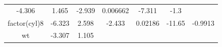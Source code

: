 \documentclass[]{article}
\theoremstyle{definition}
\theoremstyle{definition}
\theoremstyle{definition}
\theoremstyle{remark}
\begin{document}
\begin{longtable}[]{@{}ccccccc@{}}
\begin{minipage}[t]{0.11\columnwidth}
-4.306\strut
\end{minipage} & \begin{minipage}[t]{0.12\columnwidth}\centering\strut
1.465\strut
\end{minipage} & \begin{minipage}[t]{0.12\columnwidth}\centering\strut
-2.939\strut
\end{minipage} & \begin{minipage}[t]{0.12\columnwidth}\centering\strut
0.006662\strut
\end{minipage} & \begin{minipage}[t]{0.11\columnwidth}\centering\strut
-7.311\strut
\end{minipage} & \begin{minipage}[t]{0.11\columnwidth}\centering\strut
-1.3\strut
\end{minipage}\tabularnewline
\begin{minipage}[t]{0.14\columnwidth}\centering\strut
factor(cyl)8\strut
\end{minipage} & \begin{minipage}[t]{0.11\columnwidth}\centering\strut
-6.323\strut
\end{minipage} & \begin{minipage}[t]{0.12\columnwidth}\centering\strut
2.598\strut
\end{minipage} & \begin{minipage}[t]{0.12\columnwidth}\centering\strut
-2.433\strut
\end{minipage} & \begin{minipage}[t]{0.12\columnwidth}\centering\strut
0.02186\strut
\end{minipage} & \begin{minipage}[t]{0.11\columnwidth}\centering\strut
-11.65\strut
\end{minipage} & \begin{minipage}[t]{0.11\columnwidth}\centering\strut
-0.9913\strut
\end{minipage}\tabularnewline
\begin{minipage}[t]{0.14\columnwidth}\centering\strut
wt\strut
\end{minipage} & \begin{minipage}[t]{0.11\columnwidth}\centering\strut
-3.307\strut
\end{minipage} & \begin{minipage}[t]{0.12\columnwidth}\centering\strut
1.105\strut
\end{minipage} & \begin{minipage}[t]{0.12\columnwidth}\centering\strut

\end{minipage}
\end{longtable}
\end{document}

